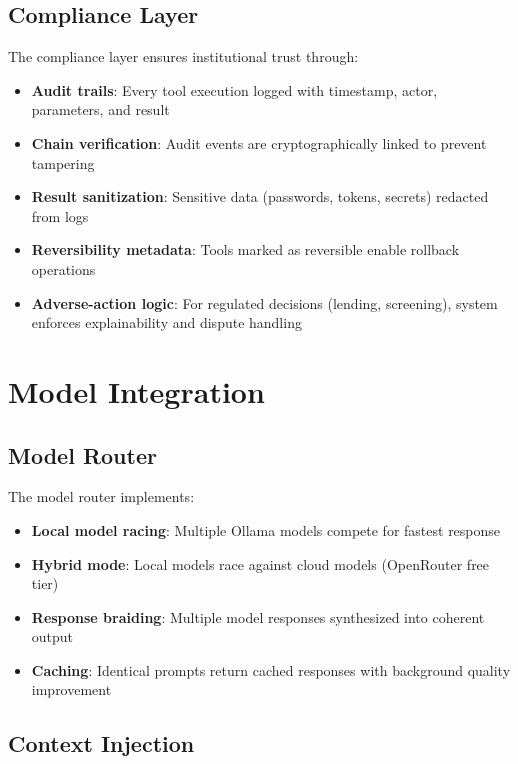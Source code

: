 \documentclass[11pt,a4paper]{article}
\begin{document}
\subsection{Compliance Layer}

The compliance layer ensures institutional trust through:
\begin{itemize}
    \item \textbf{Audit trails}: Every tool execution logged with timestamp, actor, parameters, and result
    \item \textbf{Chain verification}: Audit events are cryptographically linked to prevent tampering
    \item \textbf{Result sanitization}: Sensitive data (passwords, tokens, secrets) redacted from logs
    \item \textbf{Reversibility metadata}: Tools marked as reversible enable rollback operations
    \item \textbf{Adverse-action logic}: For regulated decisions (lending, screening), system enforces explainability and dispute handling
\end{itemize}

\section{Model Integration}

\subsection{Model Router}

The model router implements:
\begin{itemize}
    \item \textbf{Local model racing}: Multiple Ollama models compete for fastest response
    \item \textbf{Hybrid mode}: Local models race against cloud models (OpenRouter free tier)
    \item \textbf{Response braiding}: Multiple model responses synthesized into coherent output
    \item \textbf{Caching}: Identical prompts return cached responses with background quality improvement
\end{itemize}

\subsection{Context Injection}
\end{document}
